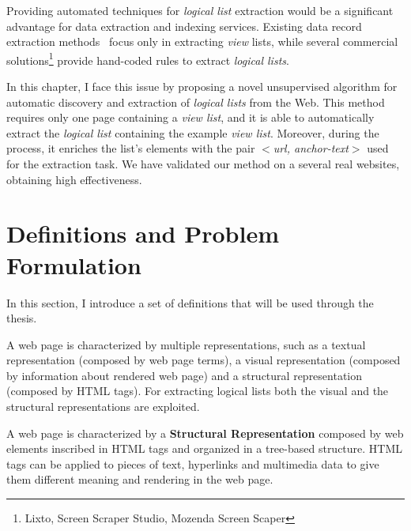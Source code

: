 Providing automated techniques for \emph{logical list} extraction would be a significant advantage for data extraction and indexing services. Existing data record extraction methods~\cite{Liu2004,miao2009,Gatterbauer2007,Liu2010} focus only in extracting \textit{view} lists, while several commercial solutions\footnote{Lixto, Screen Scraper Studio, Mozenda Screen Scaper} provide hand-coded rules to extract \emph{logical lists}. 

In this chapter, I face this issue by proposing a novel unsupervised algorithm for automatic discovery and extraction of \emph{logical lists} from the Web. This method requires only one page containing a \emph{view list}, and it is able to automatically extract the \emph{logical list} containing the example \emph{view list}. Moreover, during the process, it enriches the list's elements with the pair \emph{$<$url, anchor-text$>$}  used for the extraction task. We have validated our method on a several real websites, obtaining high effectiveness.
\section{Definitions and Problem Formulation}
\label{2Definition}
In this section, I introduce a set of definitions that will be used through the thesis.

A web page is characterized by multiple representations, such as a textual representation (composed by web page terms), a visual representation (composed by information about rendered web page) and a structural representation (composed by HTML tags). For extracting logical lists both the visual and the structural representations are exploited. %

\begin{definition}
\label{def_chap2:structuralRepresentation}
A web page is characterized by a \textbf{Structural Representation} composed by web elements inscribed in HTML tags and organized in a tree-based structure. HTML tags can be applied to pieces of text, hyperlinks and multimedia data to give them different meaning and rendering in the web page.
\end{definition}
 
